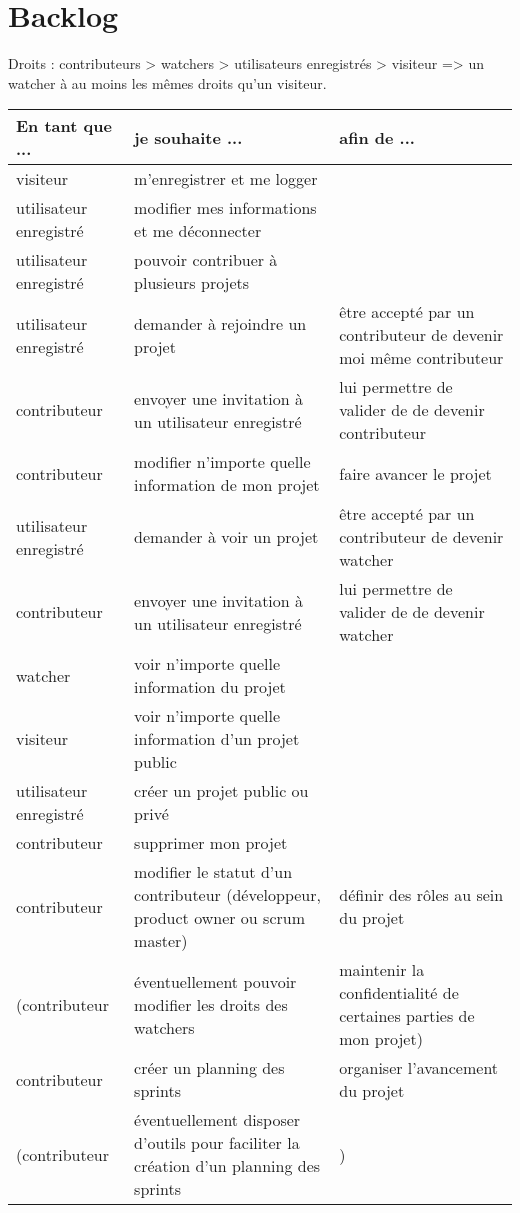 \chapter{Backlog}
Droits : contributeurs > watchers > utilisateurs enregistr\'es > visiteur => un watcher \`a au moins les m\^emes droits qu'un visiteur.\\
\begin{tabular}{|p{4.2cm}|p{5cm}|p{5cm}|}
\hline
En tant que ... & je souhaite ... & afin de ... \\
\hline
visiteur & m'enregistrer et me logger & \\
utilisateur enregistr\'e & modifier mes informations et me d\'econnecter & \\
utilisateur enregistr\'e & pouvoir contribuer \`a plusieurs projets  & \\
utilisateur enregistr\'e & demander \`a rejoindre un projet & \^etre accept\'e par un contributeur de devenir moi m\^eme contributeur \\
contributeur & envoyer une invitation \`a un utilisateur enregistr\'e & lui permettre de valider de de devenir contributeur \\
contributeur & modifier n'importe quelle information de mon projet & faire avancer le projet \\
utilisateur enregistr\'e & demander \`a voir un projet & \^etre accept\'e par un contributeur de devenir watcher \\
contributeur & envoyer une invitation \`a un utilisateur enregistr\'e & lui permettre de valider de de devenir watcher \\
watcher & voir n'importe quelle information du projet & \\
visiteur & voir n'importe quelle information d'un projet public & \\
utilisateur enregistr\'e & cr\'eer un projet public ou priv\'e & \\
contributeur & supprimer mon projet & \\
contributeur & modifier le statut d'un contributeur (d\'eveloppeur, product owner ou scrum master) & d\'efinir des r\^oles au sein du projet \\
(contributeur & \'eventuellement pouvoir modifier les droits des watchers & maintenir la confidentialit\'e de certaines parties de mon projet) \\
contributeur & cr\'eer un planning des sprints & organiser l'avancement du projet \\
(contributeur & \'eventuellement disposer d'outils pour faciliter la cr\'eation d'un planning des sprints &) \\

\end{tabular}
